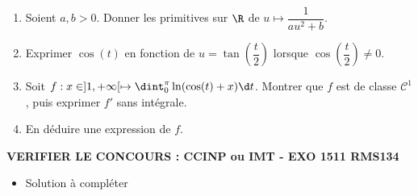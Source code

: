 \begin{enonce}
\begin{exercise}[ID={RMS134 E1511},subtitle={CCINP MP 2023},theme={analyse},concours={ccinp},annee={2023},filiere={MP}]
  \begin{enumerate}
  \item Soient $a,b>0$. Donner les primitives sur $\R$ de
    $u\mapsto\dfrac1{au^2+b}$.
  \item Exprimer $\cos(t)$ en fonction de
    $u=\tan\left(\dfrac{t}2\right)$ lorsque
    $\cos\left(\dfrac{t}2\right)\neq 0$.
  \item Soit $f:x\in]1,+\infty[\mapsto\dint_0^{\pi}\ln(\cos(t)+x)\d
    t$. Montrer que $f$ est de classe $\mathcal{C}^1$, puis exprimer
    $f'$ sans intégrale.
  \item En déduire une expression de $f$.
  \end{enumerate}
  {\bfseries VERIFIER LE CONCOURS : CCINP ou IMT - EXO 1511 RMS134}
\end{exercise}
\begin{solution}
  \begin{itemize}
    \item Solution à compléter
  \end{itemize}
\end{solution}
\end{enonce}